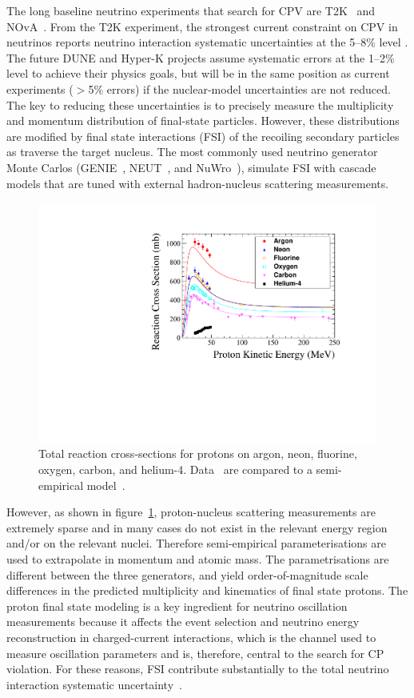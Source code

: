 The long baseline neutrino experiments that search for CPV are T2K~\cite{abe2019constraint} and NOvA~\cite{acero2018new}.
From the T2K experiment, the strongest current constraint on CPV in neutrinos reports neutrino interaction systematic uncertainties at the 5--8\% level \cite{Abe:2018wpn}.
The future DUNE and Hyper-K projects assume systematic errors at the 1--2\% level to achieve their physics goals, but will be in the same position as current experiments ($>$5\% errors) if the nuclear-model uncertainties are not reduced.  
The key to reducing these uncertainties is to precisely measure the multiplicity and momentum distribution of final-state particles. 
However, these distributions are modified by final state interactions (FSI) of the recoiling secondary particles as traverse the target nucleus.  
The most commonly used neutrino generator Monte Carlos (GENIE~\cite{Andreopoulos:2009rq}, NEUT~\cite{Hayato:2009zz}, and NuWro~\cite{GOLAN2012499}), simulate FSI with cascade models that are tuned with external hadron-nucleus scattering measurements.
\begin{figure}%
    \centering
    \includegraphics[width=12cm]{files/Figures/DataProtonCrossSections.pdf}%
    \caption{Total reaction cross-sections for protons on argon, neon, fluorine, oxygen, carbon, and helium-4. Data~\cite{Carlson:1996ofz} are compared to a semi-empirical model~\cite{wellisch1996total}.}
    \label{fig:DataProtonXSec}%
\end{figure}

However, as shown in figure~\ref{fig:DataProtonXSec}, proton-nucleus scattering measurements are extremely sparse and in many cases do not exist in the relevant energy region and/or on the relevant nuclei.
Therefore semi-empirical parameterisations are used to extrapolate in momentum and atomic mass.  
The parametrisations are different between the three generators, and yield order-of-magnitude scale differences in the predicted multiplicity and kinematics of final state protons.
The proton final state modeling is a key ingredient for neutrino oscillation measurements because it affects the event selection and neutrino energy reconstruction in charged-current interactions, which is the channel used to measure oscillation parameters and is, therefore, central to the search for CP violation\cite{Abe:2013hdq}.
For these reasons, FSI contribute substantially to the total neutrino interaction systematic uncertainty~\cite{Abe:2018wpn}. 

